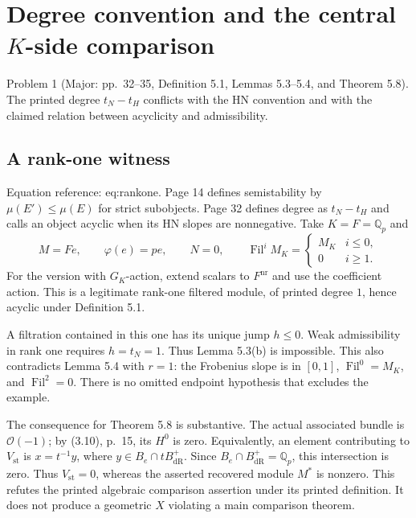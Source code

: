 \documentclass[10pt]{article}
\begin{document}
\section*{Degree convention and the central \(K\)-side comparison}
Problem 1 (Major: pp. 32–35, Definition 5.1, Lemmas 5.3–5.4, and Theorem 5.8).  The printed degree \(t_N-t_H\) conflicts with the HN convention and with the claimed relation between acyclicity and admissibility.\par
\subsection*{A rank-one witness}
Equation reference: eq:rankone. Page 14 defines semistability by \(\mu(E')\leq\mu(E)\) for strict subobjects. Page 32 defines degree as \(t_N-t_H\) and calls an object acyclic when its HN slopes are nonnegative. Take \(K=F=\mathbb Q_p\) and \[
 M=Fe,\qquad \varphi(e)=pe,\qquad N=0,\qquad
 \operatorname{Fil}^iM_K=
 \begin{cases}M_K&i\leq0,\\0&i\geq1.\end{cases}\] For the version with \(G_K\)-action, extend scalars to \(F^{\mathrm{nr}}\) and use the coefficient action. This is a legitimate rank-one filtered module, of printed degree \(1\), hence acyclic under Definition 5.1.\par
A filtration contained in this one has its unique jump \(h\leq0\). Weak admissibility in rank one requires \(h=t_N=1\). Thus Lemma 5.3(b) is impossible. This also contradicts Lemma 5.4 with \(r=1\): the Frobenius slope is in \([0,1]\), \(\operatorname{Fil}^0=M_K\), and \(\operatorname{Fil}^2=0\). There is no omitted endpoint hypothesis that excludes the example.\par
The consequence for Theorem 5.8 is substantive. The actual associated bundle is \(\mathcal O(-1)\); by (3.10), p. 15, its \(H^0\) is zero. Equivalently, an element contributing to \(V_{\mathrm{st}}\) is \(x=t^{-1}y\), where \(y\in B_e\cap tB_{\mathrm{dR}}^+\). Since \(B_e\cap B_{\mathrm{dR}}^+=\mathbb Q_p\), this intersection is zero. Thus \(V_{\mathrm{st}}=0\), whereas the asserted recovered module \(M^*\) is nonzero. This refutes the printed algebraic comparison assertion under its printed definition. It does not produce a geometric \(X\) violating a main comparison theorem.\par
\end{document}
